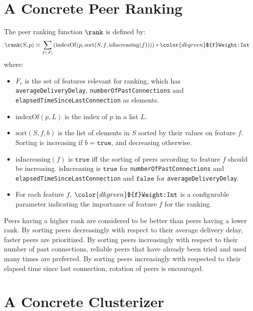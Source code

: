 \documentclass[]{llncs}
\newcommand{\conf}[2]{{\color{dkgreen}\texttt{#1:#2}}}
\begin{document}
\section{A Concrete Peer Ranking}
\label{sec:PeerRanking}


\newcommand{\indexOf}{\mathrm{indexOf}}
\newcommand{\sortBy}{\mathrm{sort}}
\newcommand{\isIncreasing}{\mathrm{isIncreasing}}

The peer ranking function $\rank$ is defined by:
\[
\rank(S, p) \equiv \sum_{f \in F_r} (\indexOf(p, \sortBy(S, f, \isIncreasing(f)))) * \conf{\$\{f\}Weight}{Int}
\]
where:
\begin{itemize}
\item $F_r$ is the set of features relevant for ranking, which has 
      \texttt{averageDeliveryDelay}, 
      \texttt{numberOfPastConnections} and 
      \texttt{elapsedTimeSinceLastConnection} as elements.
\item $\indexOf(p, L)$ is the index of $p$ in a list $L$.
\item $\sortBy(S, f, b)$ is the list of elements in $S$ sorted by their values on feature $f$. 
      Sorting is increasing if $b = \texttt{true}$, and decreasing otherwise.
\item $\isIncreasing(f)$ is $\texttt{true}$ iff the sorting of peers according to feature $f$ 
      should be increasing. $\isIncreasing$ is $\texttt{true}$ for 
      \texttt{numberOfPastConnections} and \texttt{elapsedTimeSinceLastConnection} and 
      $\texttt{false}$ for \texttt{averageDeliveryDelay}.
\item For each feature $f$, $\conf{\$\{f\}Weight}{Int}$ is a configurable parameter 
      indicating the importance of feature $f$ for the ranking.
\end{itemize}

Peers having a higher rank are considered to be better than peers having a lower rank. 
By sorting peers decreasingly with respect to their average delivery delay, 
faster peers are prioritized.
By sorting peers increasingly with respect to their number of past connections, 
reliable peers that have already been tried and used many times are preferred.
By sorting peers increasingly with respected to their elapsed time since last connection,
rotation of peers is encouraged.


\section{A Concrete Clusterizer}
\label{sec:Clusterizer}
\end{document}
